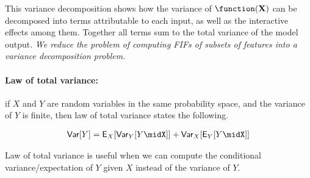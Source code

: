 This variance decomposition shows how the variance of $\function(\mathbf{X}) $ can be decomposed into terms attributable to each input, as well as the interactive effects among them. Together all terms sum to the total variance of the model output. 
\textit{We reduce the problem of computing FIFs of subsets of features into a variance decomposition problem.}


\paragraph{Law of total variance:}

if $ X $ and $ Y $ are random variables in the same probability space, and the variance of $ Y $ is finite, then law of total variance states the following.

\begin{align*}
	\mathsf{Var}[Y] = \mathsf{E}_X[\mathsf{Var}_Y[Y\midX]] + \mathsf{Var}_X[\mathsf{E}_Y[Y\midX]]
\end{align*}


Law of total variance is useful when we can compute the conditional variance/expectation of $ Y $ given $ X $ instead of the variance of $ Y $. 
\fi


